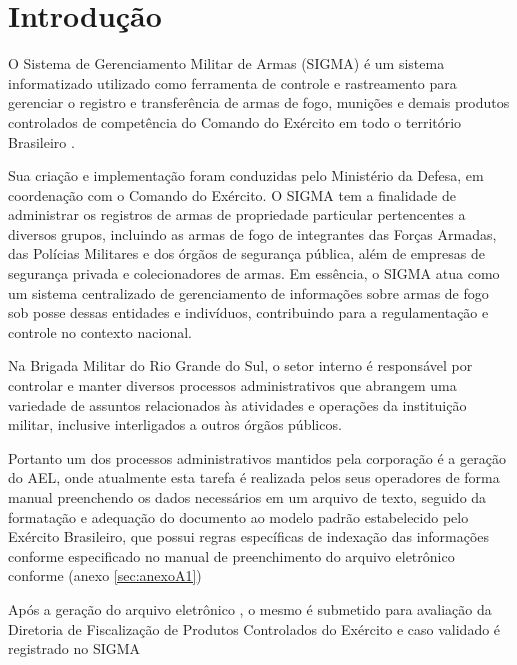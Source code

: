 \chapter{Introdução}

O Sistema de Gerenciamento Militar de Armas (SIGMA) é um sistema informatizado utilizado como ferramenta de controle e rastreamento para gerenciar o registro e transferência de armas de fogo, munições e demais produtos controlados de competência do Comando do Exército em todo o território Brasileiro 
\cite{ExércitoBrasileiro}.

Sua criação e implementação foram conduzidas pelo Ministério da Defesa, em coordenação com o Comando do Exército. O SIGMA tem a finalidade de administrar os registros de armas de propriedade particular pertencentes a diversos grupos, incluindo as armas de fogo de integrantes das Forças Armadas, das Polícias Militares e dos órgãos de segurança pública, além de empresas de segurança privada e colecionadores de armas. Em essência, o SIGMA atua como um sistema centralizado de gerenciamento de informações sobre armas de fogo sob posse dessas entidades e indivíduos, contribuindo para a regulamentação e controle no contexto nacional.
\cite{ExércitoBrasileiro}


Na Brigada Militar do Rio Grande do Sul, o setor interno é responsável por controlar e 
manter diversos processos administrativos que abrangem uma variedade de assuntos relacionados às atividades e operações da instituição militar, inclusive interligados a outros órgãos públicos. 
\cite{bmDepartamentoAdministrativo}

Portanto um dos processos administrativos mantidos pela corporação é a geração do AEL, onde atualmente esta tarefa é realizada pelos seus operadores de forma manual preenchendo os dados necessários em um arquivo de texto, seguido da formatação e adequação do documento ao modelo padrão estabelecido pelo Exército Brasileiro, que possui regras específicas de indexação das informações conforme especificado no manual de preenchimento do arquivo eletrônico conforme (anexo \ref{sec:anexoA1})   

Após a geração do arquivo eletrônico , o mesmo é submetido para avaliação da Diretoria de Fiscalização de Produtos Controlados do Exército e caso validado é registrado no SIGMA\cite{ExércitoBrasileiro}

